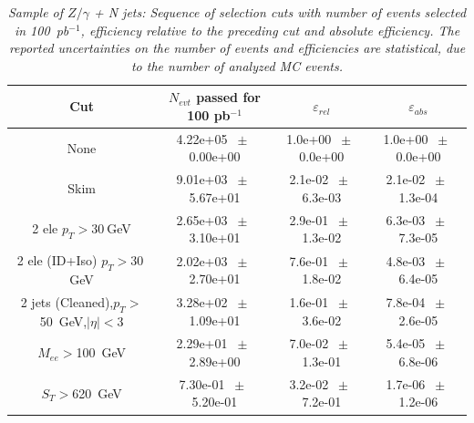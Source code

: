 \begin{table}[htbp] 
\begin{center} 
\begin{tabular}{|c|c|c|c|} 
\hline\hline 
 Cut & $N_{evt}$ passed for 100 pb$^{-1}$ & $\varepsilon_{rel}$ & $\varepsilon_{abs}$ \\ 
\hline\hline 
None       &        4.22e+05       $~\pm~$       0.00e+00        &        1.0e+00       $~\pm~$       0.0e+00        &        1.0e+00       $~\pm~$       0.0e+00       \\       
       Skim       &        9.01e+03       $~\pm~$       5.67e+01        &        2.1e-02       $~\pm~$       6.3e-03        &        2.1e-02       $~\pm~$       1.3e-04       \\       
       2 ele $p_T>30~$GeV       &        2.65e+03       $~\pm~$       3.10e+01        &        2.9e-01       $~\pm~$       1.3e-02        &        6.3e-03       $~\pm~$       7.3e-05       \\       
       2 ele (ID+Iso) $p_T>30~$GeV       &        2.02e+03       $~\pm~$       2.70e+01        &        7.6e-01       $~\pm~$       1.8e-02        &        4.8e-03       $~\pm~$       6.4e-05       \\       
       2 jets (Cleaned),$p_T>$50~GeV,$|\eta|<$3       &        3.28e+02       $~\pm~$       1.09e+01        &        1.6e-01       $~\pm~$       3.6e-02        &        7.8e-04       $~\pm~$       2.6e-05       \\       
       $M_{ee}>$100~GeV       &        2.29e+01       $~\pm~$       2.89e+00        &        7.0e-02       $~\pm~$       1.3e-01        &        5.4e-05       $~\pm~$       6.8e-06       \\       
       $S_T>$620~GeV       &        7.30e-01       $~\pm~$       5.20e-01        &        3.2e-02       $~\pm~$       7.2e-01        &        1.7e-06       $~\pm~$       1.2e-06       \\       
          \hline\hline 
\end{tabular} 
\end{center} 
\caption{\small \sl Sample of $Z/\gamma$ + N jets: Sequence of selection cuts with number of events selected in 100~pb$^{-1}$, efficiency relative to the preceding cut and absolute efficiency.  The reported uncertainties on the number of events and efficiencies are statistical, due to the number of analyzed MC events.} 
\label{tab:effic-Z} 
\end{table} 

